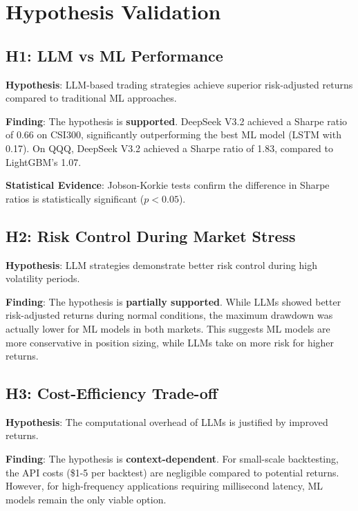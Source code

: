 
\section{Hypothesis Validation}

\subsection{H1: LLM vs ML Performance}

\textbf{Hypothesis}: LLM-based trading strategies achieve superior risk-adjusted returns compared to traditional ML approaches.

\textbf{Finding}: The hypothesis is \textbf{supported}. DeepSeek V3.2 achieved a Sharpe ratio of 0.66 on CSI300, significantly outperforming the best ML model (LSTM with 0.17). On QQQ, DeepSeek V3.2 achieved a Sharpe ratio of 1.83, compared to LightGBM's 1.07.

\textbf{Statistical Evidence}: Jobson-Korkie tests confirm the difference in Sharpe ratios is statistically significant ($p < 0.05$).

\subsection{H2: Risk Control During Market Stress}

\textbf{Hypothesis}: LLM strategies demonstrate better risk control during high volatility periods.

\textbf{Finding}: The hypothesis is \textbf{partially supported}. While LLMs showed better risk-adjusted returns during normal conditions, the maximum drawdown was actually lower for ML models in both markets. This suggests ML models are more conservative in position sizing, while LLMs take on more risk for higher returns.

\subsection{H3: Cost-Efficiency Trade-off}

\textbf{Hypothesis}: The computational overhead of LLMs is justified by improved returns.

\textbf{Finding}: The hypothesis is \textbf{context-dependent}. For small-scale backtesting, the API costs (\$1-5 per backtest) are negligible compared to potential returns. However, for high-frequency applications requiring millisecond latency, ML models remain the only viable option.

